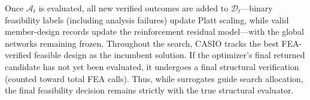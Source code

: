 Once $\mathcal{A}_t$ is evaluated, all new verified outcomes are added to $\mathcal{D}_t$—binary feasibility labels (including analysis failures) update Platt scaling, while valid member-design records update the reinforcement residual model—with the global networks remaining frozen. Throughout the search, CASIO tracks the best FEA-verified feasible design as the incumbent solution. If the optimizer's final returned candidate has not yet been evaluated, it undergoes a final structural verification (counted toward total FEA calls). Thus, while surrogates guide search allocation, the final feasibility decision remains strictly with the true structural evaluator.
